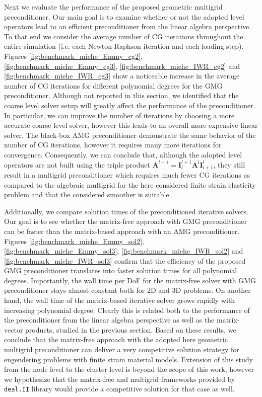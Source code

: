 \documentclass[times,doublespace]{nmeauth}
\def\gz  #1{           \mbox{$\boldsymbol{#1}$}}
\begin{document}
Next we evaluate the performance of the proposed geometric multigrid preconditioner.
{\color{red}
Our main goal is to examine whether or not the adopted level operators lead to an efficient preconditioner from the linear algebra perspective. To that end}
we consider {\color{red}the average number of CG iterations throughout the entire simulation (i.e. each Newton-Raphson iteration and each loading step).}
Figures \ref{fig:benchmark_miehe_Emmy_cg2}, \ref{fig:benchmark_miehe_Emmy_cg3}, \ref{fig:benchmark_miehe_IWR_cg2} and \ref{fig:benchmark_miehe_IWR_cg3} show a
{\color{red} noticeable} increase in the average number of CG iterations for different polynomial degrees
{\color{red} for the GMG preconditioner.
Although not reported in this section, we identified that
the coarse level solver setup will greatly affect the performance of the preconditioner.
In particular, we can improve the number of iterations by choosing a more accurate coarse level solver,
however this leads to an overall more expensive linear solver.}
The black-box AMG preconditioner
{\color{red} demonstrate the same behavior of the number of CG iterations, however it}
requires many more iterations for convergence.
{\color{red}
Consequently, we can conclude that, although the adopted level operators are not built using the triple product $\gz A^{l+1}=\gz I^{l+1}_{l} \gz A^l \gz I^l_{l+1}$, they still result in a multigrid preconditioner which requires much fewer CG iterations as compared to the algebraic multigrid for the here considered finite strain elasticity problem and that the considered smoother is suitable.
}

{\color{red}
Additionally, we compare solution times of the preconditioned iterative solvers.
Our goal is to see whether the matrix-free approach with GMG preconditioner can be faster than the matrix-based approach with an AMG preconditioner.}
Figures \ref{fig:benchmark_miehe_Emmy_sol2}, \ref{fig:benchmark_miehe_Emmy_sol3}, \ref{fig:benchmark_miehe_IWR_sol2} and \ref{fig:benchmark_miehe_IWR_sol3} confirm that the efficiency of the proposed GMG preconditioner translates into faster solution times for {\color{red}all} polynomial degrees.
{\color{red}Importantly, the wall time per DoF for the matrix-free solver with GMG preconditioner stays almost constant both for 2D and 3D problems.
On another hand, the wall time of the matrix-based iterative solver grows rapidly with increasing polynomial degree.
Clearly this is related both to the performance of the preconditioner from the linear algebra perspective as well as the matrix-vector products, studied in the previous section.
Based on these results, we conclude that the matrix-free approach with the adopted here geometric multigrid preconditioner can deliver a very competitive solution strategy for engendering problems
with finite strain material models.
Extension of this study from the node level to the cluster level is beyond the scope of this work,
however we hypothesize that the matrix-free and multigrid frameworks provided by \texttt{deal.II} library would provide a competitive solution for that case as well.}
\end{document}
